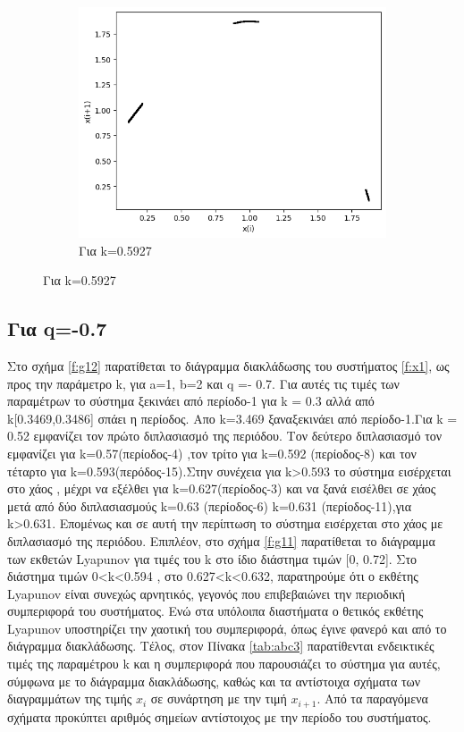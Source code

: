 \begin{figure}[h!]
\begin{subfigure}[b]{0.25\textwidth}
		\includegraphics[width=\textwidth]{LateX images/graphs q05/g11}
		\caption{Για k=0.5927}
		\label{f:36}
	\end{subfigure}
		
\end{figure}

 \clearpage

\subsection{Για q=-0.7}

Στο σχήμα \ref{f:g12} παρατίθεται το διάγραμμα διακλάδωσης του συστήματος \ref{f:x1}, ως προς την παράμετρο k, για a=1, b=2 και q =- 0.7. Για αυτές τις τιμές των παραμέτρων το σύστημα ξεκινάει από περίοδο-1 για k = 0.3 αλλά από k[0.3469,0.3486] σπάει η περίοδος. Απο k=3.469 ξαναξεκινάει από περίοδο-1.Για  k = 0.52 εμφανίζει τον πρώτο διπλασιασμό της περιόδου. Τον δεύτερο διπλασιασμό τον εμφανίζει για k=0.57(περίοδος-4) ,τον τρίτο για k=0.592 (περίοδος-8) και τον τέταρτο για k=0.593(περόδος-15).Στην συνέχεια για k>0.593 το σύστημα εισέρχεται στο χάος , μέχρι να εξέλθει  για k=0.627(περίοδος-3) και να ξανά εισέλθει σε χάος μετά από δύο διπλασιασμούς k=0.63 (περίοδος-6)  k=0.631 (περίοδος-11),για k>0.631.
Επομένως και σε αυτή την περίπτωση το σύστημα εισέρχεται στο χάος με διπλασιασμό της περιόδου. 
Επιπλέον, στο σχήμα \ref{f:g11} παρατίθεται το διάγραμμα των εκθετών Lyapunov για τιμές του k στο ίδιο διάστημα τιμών [0, 0.72].  Στο διάστημα τιμών   0<k<0.594 , στο 0.627<k<0.632, παρατηρούμε ότι ο εκθέτης Lyapunov είναι συνεχώς αρνητικός, γεγονός που επιβεβαιώνει την περιοδική συμπεριφορά του συστήματος. Ενώ στα υπόλοιπα διαστήματα ο θετικός εκθέτης Lyapunov υποστηρίζει την χαοτική του συμπεριφορά, όπως έγινε φανερό και από το διάγραμμα διακλάδωσης.
Τέλος, στον Πίνακα \ref{tab:abc3} παρατίθενται ενδεικτικές τιμές της παραμέτρου k και η συμπεριφορά που παρουσιάζει το σύστημα για αυτές, σύμφωνα με το διάγραμμα διακλάδωσης, καθώς και τα αντίστοιχα σχήματα των διαγραμμάτων της τιμής \(x_i\) σε συνάρτηση με την τιμή \(x_{i+1}\). Από τα παραγόμενα σχήματα προκύπτει αριθμός σημείων αντίστοιχος με την περίοδο του συστήματος.


